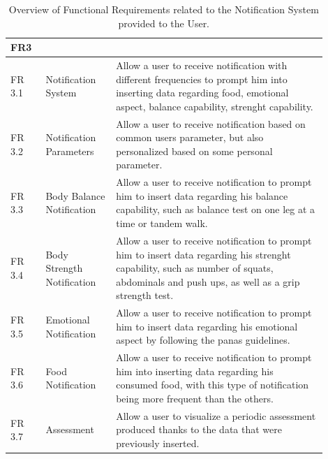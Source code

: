 \begin{table}[h!]
    \setstretch{\myspacing}
    \centering
    \begin{tabular}{|>{\raggedright\arraybackslash}p{0.1\linewidth}|>{\raggedright\arraybackslash}p{0.2\linewidth}|>{\raggedright\arraybackslash}p{0.6\linewidth}|}
        \hline
        \textbf{FR3} & \multicolumn{2}{>{\centering\arraybackslash}p{0.7\linewidth}|}{\textbf{Notification System}} \\
        \hline
        FR 3.1 & Notification System & Allow a user to receive notification with different frequencies to prompt him into inserting data regarding food, emotional aspect, balance capability, strenght capability. \\
        \hline
        FR 3.2 & Notification Parameters & Allow a user to receive notification based on common users parameter, but also personalized based on some personal parameter. \\
        \hline
        FR 3.3 & Body Balance Notification & Allow a user to receive notification to prompt him to insert data regarding his balance capability, such as balance test on one leg at a time or tandem walk. \\
        \hline
        FR 3.4 & Body Strength Notification & Allow a user to receive notification to prompt him to insert data regarding his strenght capability, such as number of squats, abdominals and push ups, as well as a grip strength test. \\
        \hline
        FR 3.5 & Emotional Notification & Allow a user to receive notification to prompt him to insert data regarding his emotional aspect by following the panas guidelines. \\
        \hline
        FR 3.6 & Food Notification & Allow a user to receive notification to prompt him into inserting data regarding his consumed food, with this type of notification being more frequent than the others. \\
        \hline
        FR 3.7 & Assessment & Allow a user to visualize a periodic assessment produced thanks to the data that were previously inserted. \\
        \hline
    \end{tabular}
    \caption{Overview of Functional Requirements related to the Notification System provided to the User.}
    \label{tab:fr3}
\end{table}


